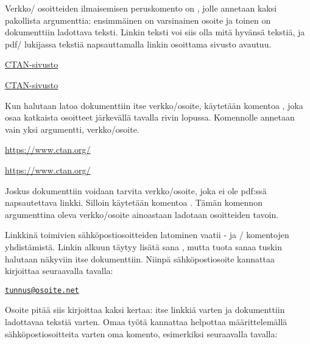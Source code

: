 Verkko\-/ osoitteiden ilmaisemisen peruskomento on ,
jolle annetaan kaksi pakollista argumenttia: ensimmäinen on varsinainen
osoite ja toinen on dokumenttiin ladottava teksti. Linkin teksti voi
siis olla mitä hyvänsä tekstiä, ja pdf\-/ lukijassa tekstiä
napsauttamalla linkin osoittama sivusto avautuu.

\begin{koodilohkosis}
\href{https://www.ctan.org/}{CTAN-sivusto}
\end{koodilohkosis}

\begin{tulossis}
  \href{https://www.ctan.org/}{CTAN-sivusto}
\end{tulossis}

\noindent
Kun halutaan latoa dokumenttiin itse verkko\-/osoite, käytetään komentoa
,  joka osaa katkaista osoitteet
järkevällä tavalla rivin lopussa. Komennolle annetaan vain yksi
argumentti, verkko\-/osoite.

\begin{koodilohkosis}
\url{https://www.ctan.org/}
\end{koodilohkosis}

\begin{tulossis}
  \url{https://www.ctan.org/}
\end{tulossis}

\noindent
Joskus dokumenttiin voidaan tarvita verkko\-/osoite, joka ei ole pdf:ssä
napsautettava linkki. Silloin käytetään komentoa .
Tämän komennon argumenttina oleva verkko\-/osoite ainoastaan ladotaan
osoitteiden tavoin.

Linkkinä toimivien sähköpostiosoitteiden latominen vaatii
- ja \-/ komentojen yhdistämistä.
Linkin alkuun täytyy lisätä sana , mutta tuota sanaa
tuskin halutaan näkyviin itse dokumenttiin. Niinpä sähköpostiosoite
kannattaa kirjoittaa seuraavalla tavalla:

\begin{koodilohkosis}
\href{mailto:tunnus@osoite.net}{\nolinkurl{tunnus@osoite.net}}
\end{koodilohkosis}

\noindent
Osoite pitää siis kirjoittaa kaksi kertaa: itse linkkiä varten ja
dokumenttiin ladottavaa tekstiä varten. Omaa työtä kannattaa helpottaa
määrittelemällä sähköpostiosoitteita varten oma komento, esimerkiksi
seuraavalla tavalla:

